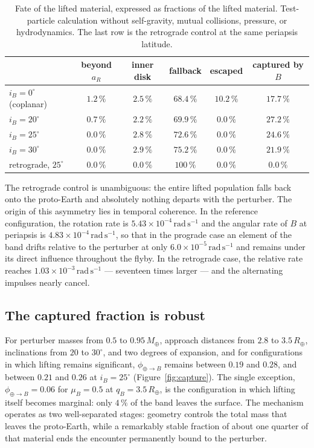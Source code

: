 \documentclass[11pt,a4paper]{article}
\begin{document}
\begin{table}[h!]
\centering
\caption{Fate of the lifted material, expressed as fractions of the lifted material. Test-particle calculation without self-gravity, mutual collisions, pressure, or hydrodynamics. The last row is the retrograde control at the same periapsis latitude.}
\vspace{0.5em}
\label{tab:fate}
\begin{tabular}{lccccc}
\toprule
 & beyond $a_R$ & inner disk & fallback & escaped & captured by $B$ \\
\midrule
$i_B=0^\circ$ (coplanar) & $1.2\,\%$ & $2.5\,\%$ & $68.4\,\%$ & $10.2\,\%$ & $17.7\,\%$ \\
$i_B=20^\circ$          & $0.7\,\%$ & $2.2\,\%$ & $69.9\,\%$ & $0.0\,\%$  & $\mathbf{27.2\,\%}$ \\
$i_B=25^\circ$          & $0.0\,\%$ & $2.8\,\%$ & $72.6\,\%$ & $0.0\,\%$  & $\mathbf{24.6\,\%}$ \\
$i_B=30^\circ$          & $0.0\,\%$ & $2.9\,\%$ & $75.2\,\%$ & $0.0\,\%$  & $\mathbf{21.9\,\%}$ \\
\midrule
retrograde, $25^\circ$  & $0.0\,\%$ & $0.0\,\%$ & $100\,\%$  & $0.0\,\%$  & $\mathbf{0.0\,\%}$ \\
\bottomrule
\end{tabular}
\end{table}

The retrograde control is unambiguous: the entire lifted population falls back onto the proto-Earth and absolutely nothing departs with the perturber. The origin of this asymmetry lies in temporal coherence. In the reference configuration, the rotation rate is $5.43\times10^{-4}\,\mathrm{rad\,s^{-1}}$ and the angular rate of $B$ at periapsis is $4.83\times10^{-4}\,\mathrm{rad\,s^{-1}}$, so that in the prograde case an element of the band drifts relative to the perturber at only $6.0\times10^{-5}\,\mathrm{rad\,s^{-1}}$ and remains under its direct influence throughout the flyby. In the retrograde case, the relative rate reaches $1.03\times10^{-3}\,\mathrm{rad\,s^{-1}}$ --- seventeen times larger --- and the alternating impulses nearly cancel.

\subsection{The captured fraction is robust}
For perturber masses from $0.5$ to $0.95\,M_\oplus$, approach distances from $2.8$ to $3.5\,R_\oplus$, inclinations from $20$ to $30^\circ$, and two degrees of expansion, and for configurations in which lifting remains significant, $\phi_{\oplus\to B}$ remains between $0.19$ and $0.28$, and between $0.21$ and $0.26$ at $i_B=25^\circ$ (Figure~\ref{fig:capture}). The single exception, $\phi_{\oplus\to B}=0.06$ for $\mu_B=0.5$ at $q_B=3.5\,R_\oplus$, is the configuration in which lifting itself becomes marginal: only $4\,\%$ of the band leaves the surface. The mechanism operates as two well-separated stages: geometry controls the total mass that leaves the proto-Earth, while a remarkably stable fraction of about one quarter of that material ends the encounter permanently bound to the perturber.
\end{document}
